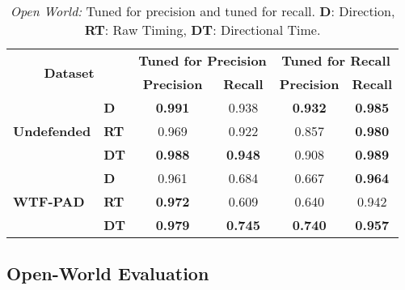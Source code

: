 \documentclass[USenglish,oneside,twocolumn]{article}
\begin{document}
\begin{table}[tbp]
\renewcommand{\arraystretch}{1.25}
  \begin{center}
    \caption{{\em Open World:} Tuned for precision and tuned for recall. \textbf{D}: Direction, \textbf{RT}: Raw Timing, \textbf{DT}: Directional Time.}\vskip -0.2cm
    \label{tab:tunedprecionrecall}
    \begin{tabular}{llcccc}
\multicolumn{2}{c}{\multirow{2}{*}{\textbf{Dataset}}}           & \multicolumn{2}{c}{\textbf{Tuned for Precision }} & \multicolumn{2}{c}{\textbf{Tuned for Recall}} \\ \cline{3-6} 
    \multicolumn{2}{c}{}                                                & \textbf{Precision}        & \textbf{Recall}       & \textbf{Precision}      & \textbf{Recall}     \\ \hline
    \multirow{3}{*}{\textbf{Undefended}} & \textbf{D}     & \textbf{0.991}                     & 0.938                 & \textbf{0.932}                   & \textbf{0.985}               \\
                                           & \textbf{RT}        & 0.969                     & 0.922                 & 0.857                   & \textbf{0.980}               \\
                                           & \textbf{DT} & \textbf{0.988}                     & \textbf{0.948}                 & 0.908                   & \textbf{0.989}               \\ \hline
    \multirow{3}{*}{\textbf{WTF-PAD}}      & \textbf{D}     & 0.961                     & 0.684                 & 0.667                   & \textbf{0.964}               \\
                                           & \textbf{RT}        & \textbf{0.972}                     & 0.609                 & 0.640                   & 0.942               \\
                                           & \textbf{DT} & \textbf{0.979}                     & \textbf{0.745}                 & \textbf{0.740}                   & \textbf{0.957}               \\ \hline
    \end{tabular}\vskip -0.6cm
   \end{center}
\end{table} 

\subsection{Open-World Evaluation}
\end{document}
